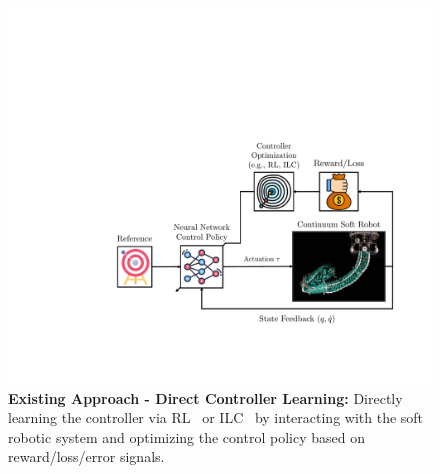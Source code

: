 \begin{figure}[ht]
    \centering
    \includegraphics[width=0.75\linewidth]{introduction/figures/controller_learning_v1_cropped.pdf}
    \caption{\textbf{Existing Approach - Direct Controller Learning:} 
    Directly learning the controller via \gls{RL}~\citep{morimoto2021model, jitosho2023reinforcement, alessi2024pushing} or \gls{ILC}~\citep{hofer2019iterative, pierallini2023provably} by interacting with the soft robotic system and optimizing the control policy based on reward/loss/error signals.
    }
    \label{fig:introduction:direct_controller_learning}
\end{figure}

